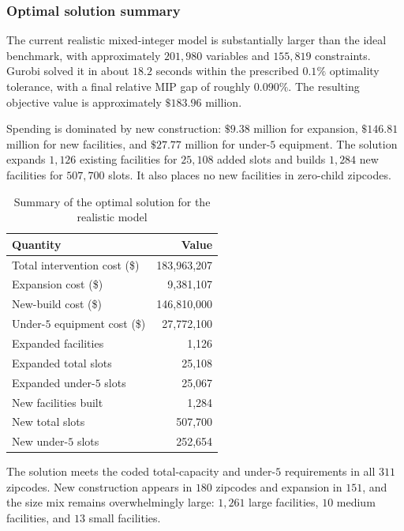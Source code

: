 \documentclass[11pt]{article}
\newcommand{\1}{\mathbb{I}}
\begin{document}
\subsubsection{Optimal solution summary}

The current realistic mixed-integer model is substantially larger than the ideal benchmark, with approximately \(201{,}980\) variables and \(155{,}819\) constraints. Gurobi solved it in about \(18.2\) seconds within the prescribed \(0.1\%\) optimality tolerance, with a final relative MIP gap of roughly \(0.090\%\). The resulting objective value is approximately \(\$183.96\) million.

Spending is dominated by new construction: \(\$9.38\) million for expansion, \(\$146.81\) million for new facilities, and \(\$27.77\) million for under-\(5\) equipment. The solution expands \(1{,}126\) existing facilities for \(25{,}108\) added slots and builds \(1{,}284\) new facilities for \(507{,}700\) slots. It also places no new facilities in zero-child zipcodes.

\begin{table}[H]
\centering
\small
\begin{tabular}{lr}
\toprule
\textbf{Quantity} & \textbf{Value} \\
\midrule
Total intervention cost (\$) & 183,963,207 \\
Expansion cost (\$) & 9,381,107 \\
New-build cost (\$) & 146,810,000 \\
Under-\(5\) equipment cost (\$) & 27,772,100 \\
Expanded facilities & 1,126 \\
Expanded total slots & 25,108 \\
Expanded under-\(5\) slots & 25,067 \\
New facilities built & 1,284 \\
New total slots & 507,700 \\
New under-\(5\) slots & 252,654 \\
\bottomrule
\end{tabular}
\caption{Summary of the optimal solution for the realistic model}
\end{table}

The solution meets the coded total-capacity and under-\(5\) requirements in all \(311\) zipcodes. New construction appears in \(180\) zipcodes and expansion in \(151\), and the size mix remains overwhelmingly large: \(1{,}261\) large facilities, \(10\) medium facilities, and \(13\) small facilities.
\end{document}
